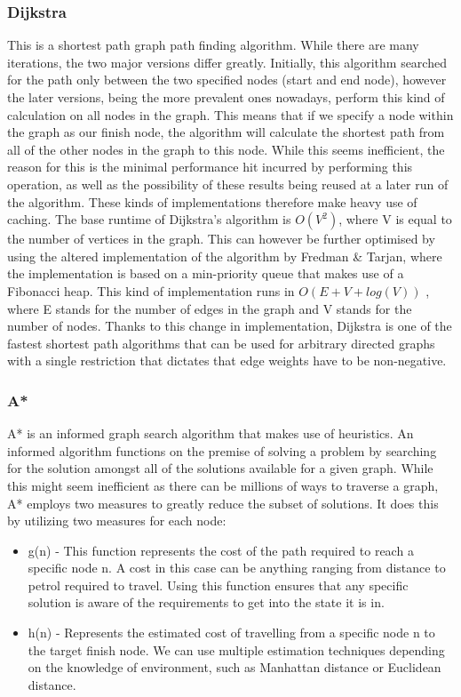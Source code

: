 \documentclass[12pt,a4paper]{report}
\begin{document}
\subsubsection{Dijkstra}
This is a shortest path graph path finding algorithm. While there are many iterations, the two major versions differ greatly. Initially, this algorithm searched for the path only between the two specified nodes (start and end node), however the later versions, being the more prevalent ones nowadays, perform this kind of calculation on all nodes in the graph. This means that if we specify a node within the graph as our finish node, the algorithm will calculate the shortest path from all of the other nodes in the graph to this node. While this seems inefficient, the reason for this is the minimal performance hit incurred by performing this operation, as well as the possibility of these results being reused at a later run of the algorithm. These kinds of implementations therefore make heavy use of caching. The base runtime of Dijkstra's algorithm is $O(V^2)$, where V is equal to the number of vertices in the graph. This can however be further optimised by using the altered implementation of the algorithm by Fredman \& Tarjan\cite{algoImprovedDijkstra}, where the implementation is based on a min-priority queue that makes use of a Fibonacci heap. This kind of implementation runs in $O( E + V + log(V) )$ , where E stands for the number of edges in the graph and V stands for the number of nodes. Thanks to this change in implementation, Dijkstra is one of the fastest shortest path algorithms that can be used for arbitrary directed graphs with a single restriction that dictates that edge weights have to be non-negative.


\subsubsection{A*}
A* is an informed graph search algorithm that makes use of heuristics.  An informed algorithm functions on the premise of solving a problem by searching for the solution amongst all of the solutions available for a given graph. While this might seem inefficient as there can be millions of ways to traverse a graph, A* employs two measures to greatly reduce the subset of solutions. It does this by utilizing two measures for each node:
\begin{itemize}
\item g(n) - This function represents the cost of the path required to reach a specific node n. A cost in this case can be anything ranging from distance to petrol required to travel. Using this function ensures that any specific solution is aware of the requirements to get into the state it is in.
\item h(n) - Represents the estimated cost of travelling from a specific node n to the target finish node. We can use multiple estimation techniques depending on the knowledge of environment, such as Manhattan distance or Euclidean distance.
\end{itemize}
\end{document}
